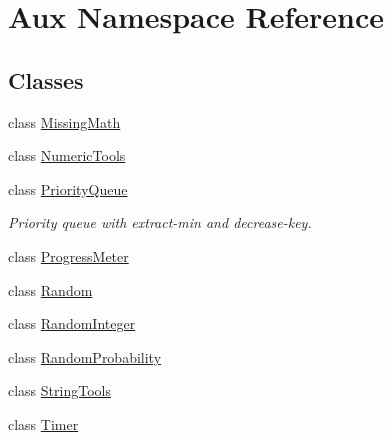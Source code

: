 \hypertarget{namespace_aux}{\section{Aux Namespace Reference}
\label{namespace_aux}
}
\subsection*{Classes}
\begin{DoxyCompactItemize}
\item 
class \hyperlink{class_aux_1_1_missing_math}{Missing\-Math}
\item 
class \hyperlink{class_aux_1_1_numeric_tools}{Numeric\-Tools}
\item 
class \hyperlink{class_aux_1_1_priority_queue}{Priority\-Queue}
\begin{DoxyCompactList}\small\item\em Priority queue with extract-\/min and decrease-\/key. \end{DoxyCompactList}\item 
class \hyperlink{class_aux_1_1_progress_meter}{Progress\-Meter}
\item 
class \hyperlink{class_aux_1_1_random}{Random}
\item 
class \hyperlink{class_aux_1_1_random_integer}{Random\-Integer}
\item 
class \hyperlink{class_aux_1_1_random_probability}{Random\-Probability}
\item 
class \hyperlink{class_aux_1_1_string_tools}{String\-Tools}
\item 
class \hyperlink{class_aux_1_1_timer}{Timer}
\end{DoxyCompactItemize}
